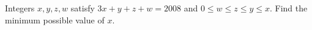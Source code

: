 Integers $x,y,z,w$ satisfy $3x+y+z+w=2008$ and $0\le w\le z\le y\le x$. Find the minimum possible value of $x$.
